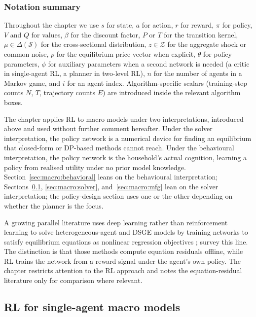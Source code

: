 \subsubsection{Notation summary}

Throughout the chapter we use $s$ for state, $a$ for action, $r$ for
reward, $\pi$ for policy, $V$ and $Q$ for values, $\beta$ for the
discount factor, $P$ or $T$ for the transition kernel,
$\mu \in \Delta(\mathcal S)$ for the cross-sectional distribution,
$z \in \mathcal Z$ for the aggregate shock or common noise, $p$ for
the equilibrium price vector when explicit, $\theta$ for policy
parameters, $\phi$ for auxiliary parameters when a second network is
needed (a critic in single-agent RL, a planner in two-level RL), $n$
for the number of agents in a Markov game, and $i$ for an agent
index. Algorithm-specific scalars (training-step counts $N$, $T$,
trajectory counts $E$) are introduced inside the relevant algorithm
boxes.

The chapter applies RL to macro models under two interpretations,
introduced above and used without further comment hereafter. Under
the solver interpretation, the policy network is a numerical device
for finding an equilibrium that closed-form or DP-based methods
cannot reach. Under the behavioural interpretation, the policy
network is the household's actual cognition, learning a policy from
realised utility under no prior model knowledge.
Section~\ref{sec:macro:behavioral} leans on the behavioural
interpretation; Sections~\ref{sec:macro:solver_single_agent},
\ref{sec:macro:solver}, and~\ref{sec:macro:mfg} lean on the solver
interpretation; the policy-design section uses one or the other
depending on whether the planner is the focus.

A growing parallel literature uses deep learning rather than
reinforcement learning to solve heterogeneous-agent and DSGE models
by training networks to satisfy equilibrium equations as nonlinear
regression objectives \citep{Maliar2021dl, Azinovic2022den,
Azinovic2026sequence, Kase2025hank, Kase2025gem,
HallHoffarth2023constraints, Carmona2021mfg, Fang2026dpi,
Thoeni2025nmfg}; \citet{Fernandez2024dl} survey this line. The
distinction is that those methods compute equation residuals offline,
while RL trains the network from a reward signal under the agent's
own policy. The chapter restricts attention to the RL approach and
notes the equation-residual literature only for comparison
where relevant.

\subsection{RL for single-agent macro models}
\label{sec:macro:solver_single_agent}

